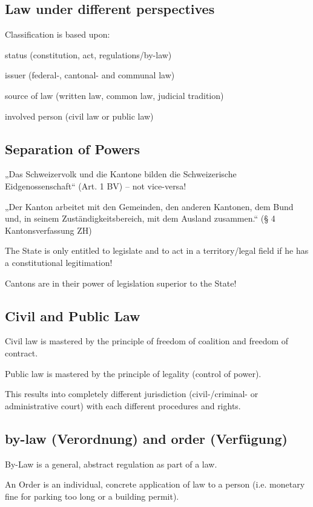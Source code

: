 \subsection{Law under different perspectives}
Classification is based upon:
\begin{compactitem}
	\item status (constitution, act, regulations/by-law)
	\item issuer (federal-, cantonal- and communal law)
	\item source of law (written law, common law, judicial tradition)
	\item involved person (civil law or public law)
\end{compactitem}

\subsection{Separation of Powers}
\begin{compactitem}
	\item „Das Schweizervolk und die Kantone bilden die Schweizerische Eidgenossenschaft“ (Art. 1 BV) – not vice-versa!
	\item „Der Kanton arbeitet mit den Gemeinden, den anderen Kantonen, dem Bund und, in seinem Zuständigkeitsbereich, mit dem Ausland zusammen.“ (§ 4 Kantonsverfassung ZH)
	\item The State is only entitled to legislate and to act in a territory/legal field if he has a constitutional legitimation!
	\item Cantons are in their power of legislation superior to the State!
\end{compactitem}

\subsection{Civil and Public Law}
\begin{compactitem}
	\item Civil law is mastered by the principle of freedom of coalition and freedom of contract.
	\item Public law is mastered by the principle of legality (control of power).
	\item This results into completely different jurisdiction (civil-/criminal-	or administrative court) with each different procedures and rights.
\end{compactitem}

\subsection{by-law (Verordnung) and order (Verfügung)}
\begin{compactitem}
	\item By-Law is a general, abstract regulation as part of a law.
	\item An Order is an individual, concrete application of law to a person (i.e. monetary fine for parking too long or a
	building permit).
\end{compactitem}

